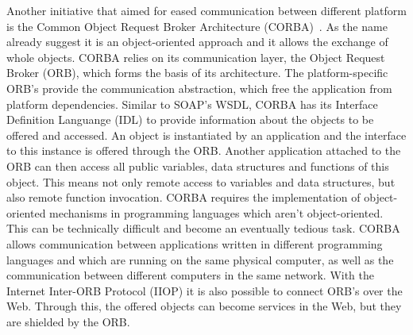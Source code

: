 Another initiative that aimed for eased communication between different platform is the Common Object Request Broker Architecture (\textrm{CORBA})~\cite{dec1991common}.
As the name already suggest it is an object-oriented approach and it allows the exchange of whole objects.
\textrm{CORBA} relies on its communication layer, the Object Request Broker (\textrm{ORB}), which forms the basis of its architecture.
The platform-specific \textrm{ORB}'s provide the communication abstraction, which free the application from platform dependencies.
Similar to \textrm{SOAP}'s \textrm{WSDL}, \textrm{CORBA} has its Interface Definition Languange (\textrm{IDL}) to provide information about the objects to be offered and accessed.
An object is instantiated by an application and the interface to this instance is offered through the \textrm{ORB}.
Another application attached to the \textrm{ORB} can then access all public variables, data structures and functions of this object.
This means not only remote access to variables and data structures, but also remote function invocation.
\textrm{CORBA} requires the implementation of object-oriented mechanisms in programming languages which aren't object-oriented.
This can be technically difficult and become an eventually tedious task.
\textrm{CORBA} allows communication between applications written in different programming languages and which are running on the same physical computer, as well as the communication between different computers in the same network.
With the Internet Inter-\textrm{ORB} Protocol (\textrm{IIOP}) it is also possible to connect \textrm{ORB}'s over the Web.
Through this, the offered objects can become services in the Web, but they are shielded by the \textrm{ORB}.

